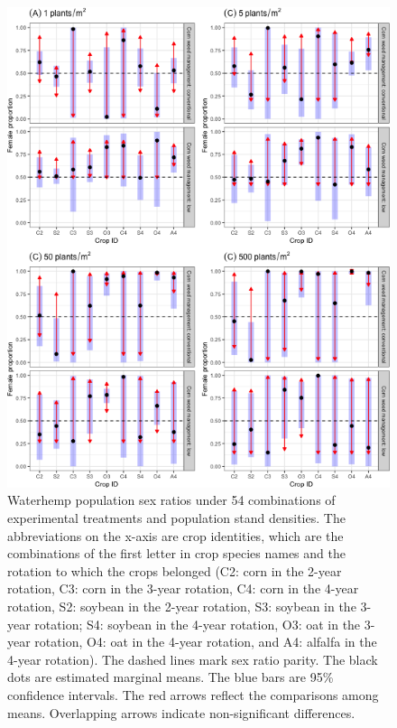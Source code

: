 \documentclass[
]{article}
\begin{document}
\begin{figure}
\centering
\includegraphics{Population-sex-biom-dens_files/figure-latex/sexr18-dens-arrow-1.png}
\caption{\label{fig:sexr18-dens-arrow}Waterhemp population sex ratios under 54 combinations of experimental treatments and population stand densities. The abbreviations on the x-axis are crop identities, which are the combinations of the first letter in crop species names and the rotation to which the crops belonged (C2: corn in the 2-year rotation, C3: corn in the 3-year rotation, C4: corn in the 4-year rotation, S2: soybean in the 2-year rotation, S3: soybean in the 3-year rotation; S4: soybean in the 4-year rotation, O3: oat in the 3-year rotation, O4: oat in the 4-year rotation, and A4: alfalfa in the 4-year rotation). The dashed lines mark sex ratio parity. The black dots are estimated marginal means. The blue bars are 95\% confidence intervals. The red arrows reflect the comparisons among means. Overlapping arrows indicate non-significant differences.}
\end{figure}
\end{document}
